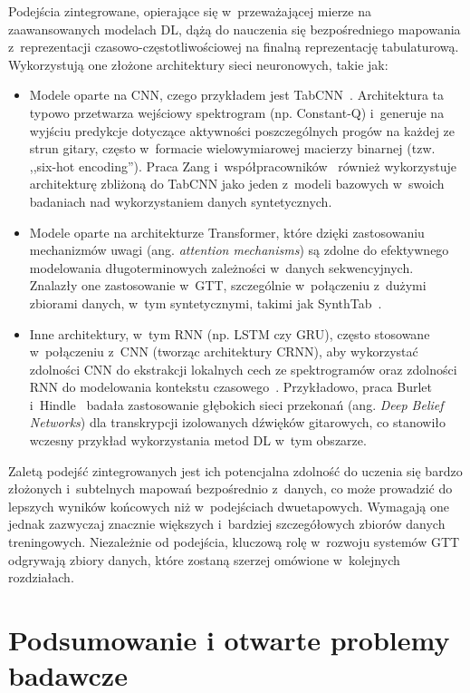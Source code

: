 Podejścia zintegrowane, opierające się w~przeważającej mierze na zaawansowanych modelach DL, dążą do nauczenia się bezpośredniego mapowania z~reprezentacji czasowo-częstotliwościowej na finalną reprezentację tabulaturową. Wykorzystują one złożone architektury sieci neuronowych, takie jak:
\begin{itemize}
    \item Modele oparte na CNN, czego przykładem jest TabCNN~\autocite{Wiggins2019TabCNN}. Architektura ta typowo przetwarza wejściowy spektrogram (np. Constant-Q) i~generuje na wyjściu predykcje dotyczące aktywności poszczególnych progów na każdej ze strun gitary, często w~formacie wielowymiarowej macierzy binarnej (tzw. ,,six-hot encoding''). Praca Zang i~współpracowników~\autocite{Zang2023SynthTab} również wykorzystuje architekturę zbliżoną do TabCNN jako jeden z~modeli bazowych w~swoich badaniach nad wykorzystaniem danych syntetycznych.
    \item Modele oparte na architekturze Transformer, które dzięki zastosowaniu mechanizmów uwagi (ang. \textit{attention mechanisms}) są zdolne do efektywnego modelowania długoterminowych zależności w~danych sekwencyjnych. Znalazły one zastosowanie w~GTT, szczególnie w~połączeniu z~dużymi zbiorami danych, w~tym syntetycznymi, takimi jak SynthTab~\autocite{Zang2023SynthTab}.
    \item Inne architektury, w~tym RNN (np. LSTM czy GRU), często stosowane w~połączeniu z~CNN (tworząc architektury CRNN), aby wykorzystać zdolności CNN do ekstrakcji lokalnych cech ze spektrogramów oraz zdolności RNN do modelowania kontekstu czasowego~\autocite{BurletHindle2017IsolatedGuitarTranscription}. Przykładowo, praca Burlet i~Hindle~\autocite{BurletHindle2017IsolatedGuitarTranscription} badała zastosowanie głębokich sieci przekonań (ang. \textit{Deep Belief Networks}) dla transkrypcji izolowanych dźwięków gitarowych, co stanowiło wczesny przykład wykorzystania metod DL w~tym obszarze.
\end{itemize}
Zaletą podejść zintegrowanych jest ich potencjalna zdolność do uczenia się bardzo złożonych i~subtelnych mapowań bezpośrednio z~danych, co może prowadzić do lepszych wyników końcowych niż w~podejściach dwuetapowych. Wymagają one jednak zazwyczaj znacznie większych i~bardziej szczegółowych zbiorów danych treningowych. Niezależnie od podejścia, kluczową rolę w~rozwoju systemów GTT odgrywają zbiory danych, które zostaną szerzej omówione w~kolejnych rozdziałach.

\section{Podsumowanie i otwarte problemy badawcze}
\label{sec:podsumowanie_analizy_gtt}

